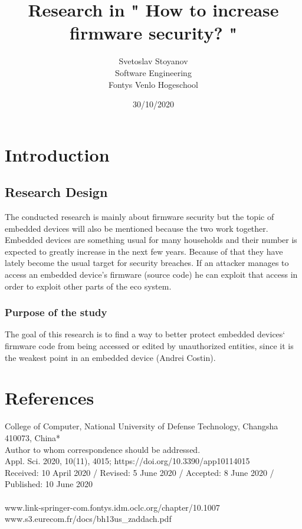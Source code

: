 \documentclass[]{report}
\begin{document}
\title{Research in " How to increase firmware security? " }
\author{Svetoslav Stoyanov \\
	Software Engineering \\
	Fontys Venlo Hogeschool}
\date {30/10/2020}
\maketitle

\tableofcontents
\chapter{Introduction}
\section{Research Design}
The conducted research is mainly about firmware security but the topic of embedded devices will also be mentioned because the two work together.
Embedded devices are something usual for many households and their number is expected to greatly increase in the next few years. Because of that they have lately become the usual target for security breaches. If an attacker manages to access an embedded device's firmware (source code) he can exploit that access in order to exploit other parts of the eco system.

\subsection{Purpose of the study} 
The goal of this research is to find a way to better protect embedded devices` firmware code from being accessed or edited by unauthorized entities, since it is the weakest point in an embedded device (Andrei Costin).
\chapter{References}

College of Computer, National University of Defense Technology, Changsha 410073, China* \\

Author to whom correspondence should be addressed. \\
Appl. Sci. 2020, 10(11), 4015; https://doi.org/10.3390/app10114015 \\
Received: 10 April 2020 / Revised: 5 June 2020 / Accepted: 8 June 2020 / Published: 10 June 2020 \\
\\
www.link-springer-com.fontys.idm.oclc.org/chapter/10.1007%
\\
www.s3.eurecom.fr/docs/bh13us\_zaddach.pdf
\end{document}
